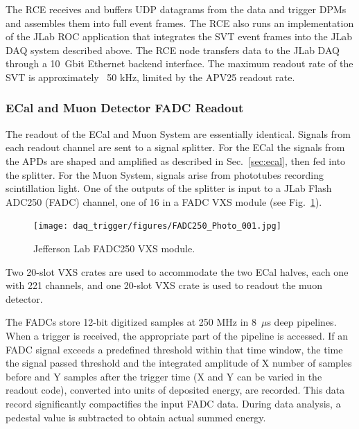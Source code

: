 The RCE receives and buffers UDP datagrams from the data and trigger DPMs and
 assembles them into full event frames. The RCE also runs an implementation of the JLab ROC application 
that integrates the SVT event frames into the JLab DAQ 
 system described above. The RCE node transfers data to the JLab DAQ  
 through a 10~Gbit Ethernet backend interface. The maximum readout rate of the SVT is approximately 
~50 kHz, limited by the APV25 readout rate. 








\subsubsection{ECal and Muon Detector FADC Readout}
\label{sec:fadc_daq}
The readout of the ECal and Muon System are essentially identical. Signals from each 
readout channel are sent to a signal splitter. For the ECal the signals from the APDs are 
shaped and amplified as described in Sec.~\ref{sec:ecal}, then fed into the 
splitter. For the Muon System, signals arise from phototubes recording scintillation light.
One of the outputs of the splitter is input to a 
JLab Flash ADC250 (FADC) channel, one of 16 in a FADC VXS module (see Fig.~\ref{fig:fadc}).
\begin{figure}[]
\texttt{[image: daq\_trigger/figures/FADC250\_Photo\_001.jpg]}
\caption{\small{Jefferson Lab FADC250 VXS module.}}
\label{fig:fadc}
\end{figure}


Two 20-slot VXS crates are used to accommodate the two ECal 
halves, each one with 221 channels, and one 20-slot VXS crate is used to readout the muon 
detector. 

The FADCs store 12-bit digitized samples at 250 MHz in 8~$\mu$s deep pipelines. 
When a trigger is received, the appropriate part of the pipeline is accessed. If an FADC   
signal exceeds a predefined threshold within that time window, the time the signal passed threshold and the integrated
amplitude of X number of samples before and Y samples after the trigger time (X and Y can be varied in the readout code), 
converted into units of deposited energy, are recorded. This data record significantly compactifies the  
input FADC data. During data analysis, a pedestal value is subtracted to obtain actual summed energy.

